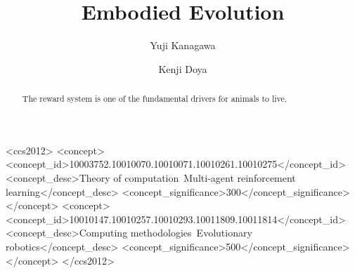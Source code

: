 \documentclass[sigconf]{acmart}
\begin{document}
\title{Embodied Evolution}

\author{Yuji Kanagawa}

\author{Kenji Doya}

\begin{abstract}
  The reward system is one of the fundamental drivers for animals to live.
\end{abstract}

\begin{CCSXML}
<ccs2012>
   <concept>
       <concept_id>10003752.10010070.10010071.10010261.10010275</concept_id>
       <concept_desc>Theory of computation~Multi-agent reinforcement learning</concept_desc>
       <concept_significance>300</concept_significance>
       </concept>
   <concept>
       <concept_id>10010147.10010257.10010293.10011809.10011814</concept_id>
       <concept_desc>Computing methodologies~Evolutionary robotics</concept_desc>
       <concept_significance>500</concept_significance>
       </concept>
 </ccs2012>
\end{CCSXML}




\maketitle





\appendix

\end{document}
